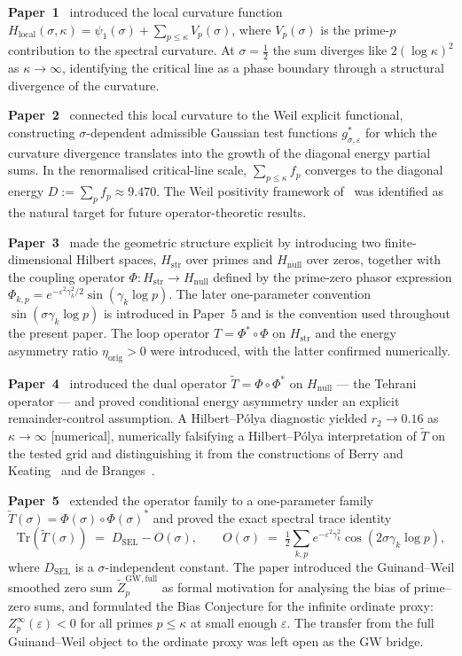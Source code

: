\documentclass[11pt]{article}
\newcommand{\Hstr}{H_{\mathrm{str}}}
\newcommand{\Hnull}{H_{\mathrm{null}}}
\newcommand{\etaorig}{\eta_{\mathrm{orig}}}
\newcommand{\Tt}{\widetilde{T}}
\newcommand{\Hlocal}{H_{\mathrm{local}}}
\newcommand{\DSEL}{D_{\mathrm{SEL}}}
\begin{document}
\textbf{Paper~1}~\cite{Paper1} introduced the local curvature function
$\Hlocal(\sigma,\kappa)=\psi_1(\sigma)+\sum_{p\le\kappa}V_p(\sigma)$,
where $V_p(\sigma)$ is the prime-$p$ contribution to the spectral curvature.
At $\sigma=\tfrac12$ the sum diverges like $2(\log\kappa)^2$ as $\kappa\to\infty$,
identifying the critical line as a phase boundary through a structural
divergence of the curvature.

\textbf{Paper~2}~\cite{Paper2} connected this local curvature to the
Weil explicit functional, constructing $\sigma$-dependent admissible
Gaussian test functions $g^*_{\sigma,\varepsilon}$ for which the
curvature divergence translates into the growth of the diagonal
energy partial sums. In the renormalised critical-line scale,
$\sum_{p\le\kappa}f_p$ converges to the diagonal energy
$D:=\sum_p f_p\approx 9.470$.
The Weil positivity framework of~\cite{Lagarias} was identified as the
natural target for future operator-theoretic results.

\textbf{Paper~3}~\cite{Paper3} made the geometric structure explicit
by introducing two finite-dimensional Hilbert spaces, $\Hstr$ over
primes and $\Hnull$ over zeros, together with the coupling operator
$\Phi:\Hstr\to\Hnull$ defined by the prime-zero phasor expression
$\Phi_{k,p}=e^{-\varepsilon^2\gamma_k^2/2}\sin(\gamma_k\log p)$.
The later one-parameter convention $\sin(\sigma\gamma_k\log p)$
is introduced in Paper~5 and is the convention used throughout
the present paper.
The loop operator $T=\Phi^*\circ\Phi$ on $\Hstr$ and the energy
asymmetry ratio $\etaorig>0$ were introduced, with the latter
confirmed numerically.

\textbf{Paper~4}~\cite{Paper4} introduced the dual operator
$\Tt=\Phi\circ\Phi^*$ on $\Hnull$ --- the Tehrani operator --- and
proved conditional energy asymmetry under an explicit remainder-control
assumption.
A Hilbert--P\'olya diagnostic yielded $r_2\to 0.16$ as $\kappa\to\infty$
[numerical], numerically falsifying a Hilbert--P\'olya interpretation
of $\Tt$ on the tested grid and
distinguishing it from the constructions of Berry and
Keating~\cite{BerryKeating} and de Branges~\cite{deBranges}.

\textbf{Paper~5}~\cite{Paper5} extended the operator family to a
one-parameter family $\Tt(\sigma)=\Phi(\sigma)\circ\Phi(\sigma)^*$
and proved the exact spectral trace identity
\[
\mathrm{Tr}(\Tt(\sigma)) \;=\; \DSEL - O(\sigma), \qquad
O(\sigma) \;=\; \tfrac12\sum_{k,p}e^{-\varepsilon^2\gamma_k^2}
             \cos(2\sigma\gamma_k\log p),
\]
where $\DSEL$ is a $\sigma$-independent constant.
The paper introduced the Guinand--Weil smoothed zero sum
$\widetilde Z_p^{\mathrm{GW,full}}$ as formal motivation for analysing the
bias of prime--zero sums, and formulated the Bias Conjecture for the
infinite ordinate proxy: $Z_p^\infty(\varepsilon)<0$ for all primes
$p\le\kappa$ at small enough $\varepsilon$.
The transfer from the full Guinand--Weil object to the ordinate proxy
was left open as the GW bridge.
\end{document}
